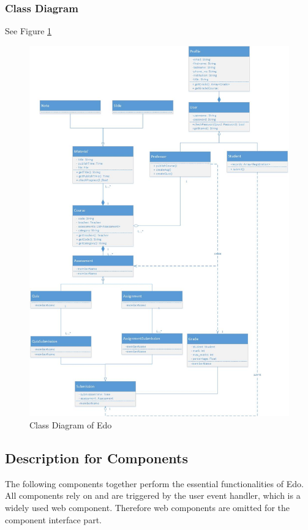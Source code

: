 \documentclass[paper=a4, fontsize=11pt]{scrartcl}
\numberwithin{equation}{section}		%
\numberwithin{figure}{section}			%
\numberwithin{table}{section}				%
\begin{document}
\subsubsection{Class Diagram}
See Figure \ref{classs}
\begin{figure}[!ht]
	\begin{center}
		\includegraphics[width=\textwidth,height=\textheight,keepaspectratio]{class}
	\end{center}
	\caption{Class Diagram of Edo}
		\label{classs}
\end{figure}


\subsection{Description for Components}

The following components together perform the essential functionalities of Edo. All components rely on and are triggered by the user event handler, which is a widely used web component. Therefore web components are omitted for the component interface part.
\end{document}

